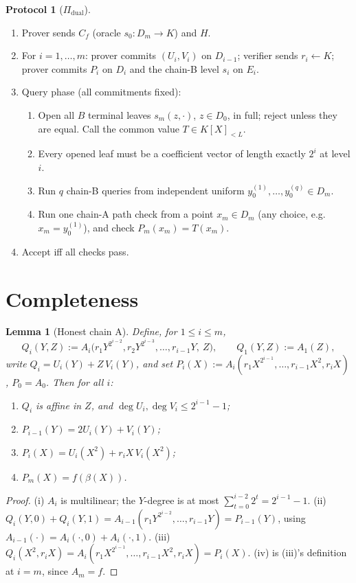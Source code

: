 \documentclass[11pt]{article}
\newtheorem{lemma}[theorem]{Lemma}
\theoremstyle{definition}
\newtheorem{protocol}[theorem]{Protocol}
\newcommand{\K}{K}
\begin{document}
\begin{protocol}[$\Pi_{\mathrm{dual}}$]\label{prot:dual}\
\begin{enumerate}[label=\arabic*.,leftmargin=*]
\item Prover sends $C_f$ (oracle $s_0:D_m\to\K$) and $H$.
\item For $i=1,\dots,m$: prover commits $(U_i,V_i)$ on $D_{i-1}$; verifier sends $r_i\leftarrow\K$; prover commits $P_i$ on $D_i$ and the chain-B level $s_i$ on $E_i$.
\item Query phase (all commitments fixed):
\begin{enumerate}[label=(\alph*)]
\item[(F1)] Open all $B$ terminal leaves $s_m(z,\cdot)$, $z\in D_0$, in full; reject unless they are equal. Call the common value $T\in\K[X]_{<L}$.
\item[(F2)] Every opened leaf must be a coefficient vector of length exactly $2^i$ at level $i$.
\item[(F3)] Run $q$ chain-B queries from independent uniform $y_0^{(1)},\dots,y_0^{(q)}\in D_m$.
\item[(A)] Run one chain-A path check from a point $x_m\in D_m$ (any choice, e.g.\ $x_m=y_0^{(1)}$), and check $P_m(x_m)=T(x_m)$.
\end{enumerate}
\item Accept iff all checks pass.
\end{enumerate}
\end{protocol}

\section{Completeness}

\begin{lemma}[Honest chain A]\label{lem:chainA}
Define, for $1\le i\le m$,
\[
Q_i(Y,Z):=A_i\big(r_1Y^{2^{i-2}},r_2Y^{2^{i-3}},\dots,r_{i-1}Y,\ Z\big),\qquad Q_1(Y,Z):=A_1(Z),
\]
write $Q_i=U_i(Y)+Z\,V_i(Y)$, and set $P_i(X):=A_i(r_1X^{2^{i-1}},\dots,r_{i-1}X^2,r_iX)$, $P_0=A_0$. Then for all $i$:
\begin{enumerate}[label=(\roman*)]
\item $Q_i$ is affine in $Z$, and $\deg U_i,\deg V_i\le2^{i-1}-1$;
\item $P_{i-1}(Y)=2U_i(Y)+V_i(Y)$;
\item $P_i(X)=U_i(X^2)+r_iX\,V_i(X^2)$;
\item $P_m(X)=f(\beta(X))$.
\end{enumerate}
\end{lemma}
\begin{proof}
(i) $A_i$ is multilinear; the $Y$-degree is at most $\sum_{t=0}^{i-2}2^t=2^{i-1}-1$. (ii) $Q_i(Y,0)+Q_i(Y,1)=A_{i-1}(r_1Y^{2^{i-2}},\dots,r_{i-1}Y)=P_{i-1}(Y)$, using $A_{i-1}(\cdot)=A_i(\cdot,0)+A_i(\cdot,1)$. (iii) $Q_i(X^2,r_iX)=A_i(r_1X^{2^{i-1}},\dots,r_{i-1}X^2,r_iX)=P_i(X)$. (iv) is (iii)'s definition at $i=m$, since $A_m=f$.
\end{proof}
\end{document}
